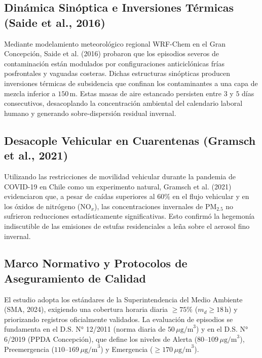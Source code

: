 \documentclass[10pt,twocolumn,a4paper]{article}
\begin{document}
\subsection{Dinámica Sinóptica e Inversiones Térmicas (Saide et al., 2016)}
Mediante modelamiento meteorológico regional WRF-Chem en el Gran Concepción, Saide et al. (2016) probaron que los episodios severos de contaminación están modulados por configuraciones anticiclónicas frías posfrontales y vaguadas costeras. Dichas estructuras sinópticas producen inversiones térmicas de subsidencia que confinan los contaminantes a una capa de mezcla inferior a $150\,\text{m}$. Estas masas de aire estancado persisten entre $3$ y $5$ días consecutivos, desacoplando la concentración ambiental del calendario laboral humano y generando sobre-dispersión residual invernal.

\subsection{Desacople Vehicular en Cuarentenas (Gramsch et al., 2021)}
Utilizando las restricciones de movilidad vehicular durante la pandemia de COVID-19 en Chile como un experimento natural, Gramsch et al. (2021) evidenciaron que, a pesar de caídas superiores al $60\%$ en el flujo vehicular y en los óxidos de nitrógeno ($\text{NO}_x$), las concentraciones invernales de $\text{PM}_{2.5}$ no sufrieron reducciones estadísticamente significativas. Esto confirmó la hegemonía indiscutible de las emisiones de estufas residenciales a leña sobre el aerosol fino invernal.

\subsection{Marco Normativo y Protocolos de Aseguramiento de Calidad}
El estudio adopta los estándares de la Superintendencia del Medio Ambiente (SMA, 2024), exigiendo una cobertura horaria diaria $\ge 75\%$ ($m_d \ge 18\,\text{h}$) y priorizando registros oficialmente validados. La evaluación de episodios se fundamenta en el D.S. N° 12/2011 (norma diaria de $50\,\mu\text{g/m}^3$) y en el D.S. N° 6/2019 (PPDA Concepción), que define los niveles de Alerta ($80\text{--}109\,\mu\text{g/m}^3$), Preemergencia ($110\text{--}169\,\mu\text{g/m}^3$) y Emergencia ($\ge 170\,\mu\text{g/m}^3$).
\end{document}
